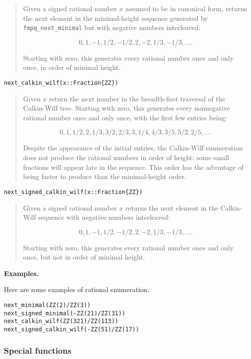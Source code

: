 \documentclass[a4paper,10pt]{article}
\newcommand{\code}{\lstinline}
\newcommand{\desc}[1]{\vspace{-3mm}\begin{quote}#1\end{quote}}
\begin{document}
{{\desc{Given a signed rational number $x$ assumed to be in canonical form, 
returns the next element in the minimal-height sequence generated by 
\code{fmpq_next_minimal} but with negative numbers interleaved:

$$0, 1, -1, 1/2, -1/2, 2, -2, 1/3, -1/3, \ldots.$$

Starting with zero, this generates every rational number once and only once,
in order of minimal height.}

\begin{lstlisting}
next_calkin_wilf(x::Fraction{ZZ})
\end{lstlisting}

\desc{Given $x$ return the next number in the breadth-first traversal of the
Calkin-Wilf tree. Starting with zero, this generates every nonnegative
rational number once and only once, with the first few entries being:

$$0, 1, 1/2, 2, 1/3, 3/2, 2/3, 3, 1/4, 4/3, 3/5, 5/2, 2/5, \ldots.$$

Despite the appearance of the initial entries, the Calkin-Wilf enumeration 
does not produce the rational numbers in order of height: some small fractions
will appear late in the sequence. This order has the advantage of being faster 
to produce than the minimal-height order.}

\begin{lstlisting}
next_signed_calkin_wilf(x::Fraction{ZZ})
\end{lstlisting}

\desc{Given a signed rational number $x$ returns the next element in the
Calkin-Wilf sequence with negative numbers interleaved:

$$0, 1, -1, 1/2, -1/2, 2, -2, 1/3, -1/3, \ldots.$$

Starting with zero, this generates every rational number once and only once,
but not in order of minimal height.}

\textbf{Examples.}

Here are some examples of rational enumeration.

\begin{lstlisting}
next_minimal(ZZ(2)/ZZ(3))
next_signed_minimal(-ZZ(21)/ZZ(31))
next_calkin_wilf(ZZ(321)/ZZ(113))
next_signed_calkin_wilf(-ZZ(51)/ZZ(17))
\end{lstlisting}

\subsubsection{Special functions}

}}
\end{document}

